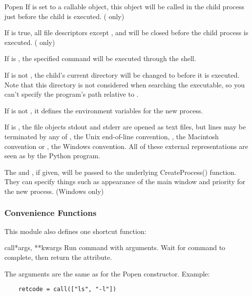\begin{classdesc}{Popen}
If  is set to a callable object, this object will be
called in the child process just before the child is executed.
(\UNIX{} only)

If  is true, all file descriptors except ,
 and  will be closed before the child process is
executed. (\UNIX{} only)

If  is , the specified command will be
executed through the shell.

If  is not , the child's current directory will be
changed to  before it is executed.  Note that this directory
is not considered when searching the executable, so you can't specify
the program's path relative to .

If  is not , it defines the environment variables
for the new process.

If  is , the file objects stdout
and stderr are opened as text files, but lines may be terminated by
any of , the Unix end-of-line convention, ,
the Macintosh convention or , the Windows convention.
All of these external representations are seen as  by the
Python program.  

The  and , if given, will be
passed to the underlying CreateProcess() function.  They can specify
things such as appearance of the main window and priority for the new
process.  (Windows only)
\end{classdesc}

\subsubsection{Convenience Functions}

This module also defines one shortcut function:

\begin{funcdesc}{call}{*args, **kwargs}
Run command with arguments.  Wait for command to complete, then
return the  attribute.

The arguments are the same as for the Popen constructor.  Example:

\begin{verbatim}
    retcode = call(["ls", "-l"])
\end{verbatim}
\end{funcdesc}


